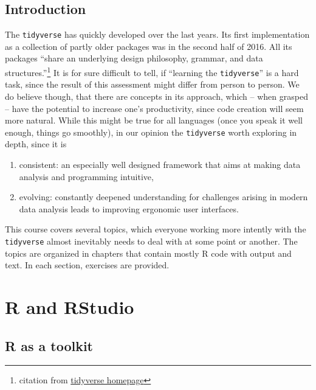 \documentclass[]{book}
\providecommand{\tightlist}{%
  \setlength{\itemsep}{0pt}\setlength{\parskip}{0pt}}
\let\rmarkdownfootnote\footnote%
\def\footnote{\protect\rmarkdownfootnote}
\begin{document}
\hypertarget{introduction}{%
\section*{Introduction}\label{introduction}}

The \texttt{tidyverse} has quickly developed over the last years.
Its first implementation as a collection of partly older packages was in the second half of 2016.
All its packages ``share an underlying design philosophy, grammar, and data structures.''\footnote{citation from \href{https://www.tidyverse.org/}{tidyverse homepage}}
It is for sure difficult to tell, if ``learning the \texttt{tidyverse}'' is a hard task, since the result of this assessment might differ from person to person.
We do believe though, that there are concepts in its approach, which -- when grasped -- have the potential to increase one's productivity, since code creation will seem more natural.
While this might be true for all languages (once you speak it well enough, things go smoothly), in our opinion the \texttt{tidyverse} worth exploring in depth, since it is

\begin{enumerate}
\def\labelenumi{\arabic{enumi}.}
\tightlist
\item
  consistent: an especially well designed framework that aims at making data analysis and programming intuitive,
\item
  evolving: constantly deepened understanding for challenges arising in modern data analysis leads to improving ergonomic user interfaces.
\end{enumerate}

This course covers several topics, which everyone working more intently with the \texttt{tidyverse} almost inevitably needs to deal with at some point or another.
The topics are organized in chapters that contain mostly R code with output and text.
In each section, exercises are provided.

\hypertarget{r-and-rstudio}{%
\chapter{R and RStudio}\label{r-and-rstudio}}

\hypertarget{r-as-a-toolkit}{%
\section{R as a toolkit}\label{r-as-a-toolkit}}
\end{document}
